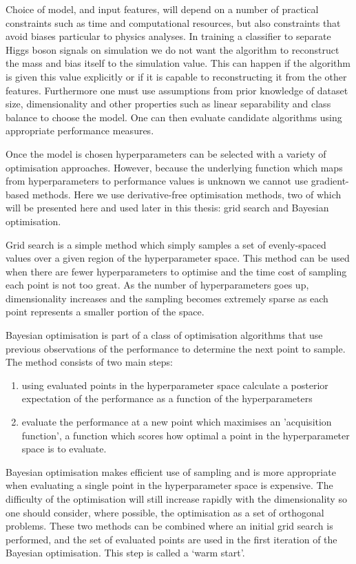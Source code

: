Choice of model, and input features, will depend on a number of practical constraints such as time and computational resources, but also constraints that avoid biases particular to physics analyses. 
In training a classifier to separate Higgs boson signals on simulation we do not want the algorithm to reconstruct the mass and bias itself to the simulation value. This can happen if the algorithm is given this value explicitly or if it is capable to reconstructing it from the other features.  
Furthermore one must use assumptions from prior knowledge of dataset size, dimensionality and other properties such as linear separability and class balance to choose the model. One can then evaluate candidate algorithms using appropriate performance measures. 


Once the model is chosen hyperparameters can be selected with a variety of optimisation approaches. However, because the underlying function which maps from hyperparameters to performance values is unknown we cannot use gradient-based methods. Here we use derivative-free optimisation methods, two of which will be presented here and used later in this thesis: grid search and Bayesian optimisation.

Grid search is a simple method which simply samples a set of evenly-spaced values over a given region of the hyperparameter space. 
This method can be used when there are fewer hyperparameters to optimise and the time cost of sampling each point is not too great. 
As the number of hyperparameters goes up, dimensionality increases and the sampling becomes extremely sparse as each point represents a smaller portion of the space.

Bayesian optimisation is part of a class of optimisation algorithms that use previous observations of the performance to determine the next point to sample. 
The method consists of two main steps:
\begin{enumerate}[leftmargin=.5in,noitemsep]
    \item using evaluated points in the hyperparameter space calculate a posterior expectation of the performance as a function of the hyperparameters
    \item evaluate the performance at a new point which maximises an 'acquisition function', a function which scores how optimal a point in the hyperparameter space is to evaluate. 
\end{enumerate}
Bayesian optimisation makes efficient use of sampling and is more appropriate when evaluating a single point in the hyperparameter space is expensive. The difficulty of the optimisation will still increase rapidly with the dimensionality so one should consider, where possible, the optimisation as a set of orthogonal problems.  
These two methods can be combined where an initial grid search is performed, and the set of evaluated points are used in the first iteration of the Bayesian optimisation. 
This step is called a `warm start'. 

